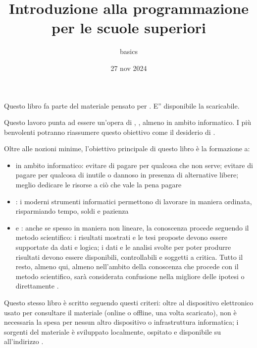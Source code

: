 \documentclass[letterpaper,10pt,italian]{jupyterBook}
\title{Introduzione alla programmazione per le scuole superiori}
\date{27 nov 2024}
\author{basics}
\begin{document}
\pagestyle{empty}
\sphinxmaketitle
\pagestyle{plain}
\sphinxtableofcontents
\pagestyle{normal}
\label{\detokenize{intro::doc}}


\sphinxAtStartPar
Questo libro fa parte del materiale pensato per . E” disponibile la  scaricabile.

\sphinxAtStartPar
{} Questo lavoro punta ad essere un’opera di  ,   , almeno in ambito informatico. I più benvolenti potranno riassumere questo obiettivo come il desiderio di .

\sphinxAtStartPar
Oltre alle nozioni minime, l’obiettivo principale di questo libro è la formazione a:
\begin{itemize}
\item {} 
\sphinxAtStartPar
{} in ambito informatico: evitare di pagare per qualcosa che non serve; evitare di pagare per qualcosa di inutile o dannoso in presenza di alternative libere; meglio dedicare le risorse a ciò che vale la pena pagare

\item {} 
\sphinxAtStartPar
{}: i moderni strumenti informatici permettono di lavorare in maniera ordinata, risparmiando tempo, soldi e pazienza

\item {} 
\sphinxAtStartPar
{} e : anche se spesso in maniera non lineare, la conoscenza procede seguendo il metodo scientifico: i risultati mostrati e le tesi proposte devono essere supportate da dati e logica; i dati e le analisi svolte per poter produrre risultati devono essere disponibili, controllabili e soggetti a critica. Tutto il resto, almeno qui, almeno nell’ambito della conoscenza che procede con il metodo scientifico, sarà considerata confusione nella migliore delle ipotesi o direttamente .

\end{itemize}

\sphinxAtStartPar
Questo stesso libro è scritto seguendo questi criteri: oltre al dispositivo elettronico usato per consultare il materiale (online o offline, una volta scaricato), non è necessaria la spesa per nessun altro dispositivo o infrastruttura informatica; i sorgenti del materiale è sviluppato localmente, ospitato e disponibile su  all’indirizzo .
\end{document}
